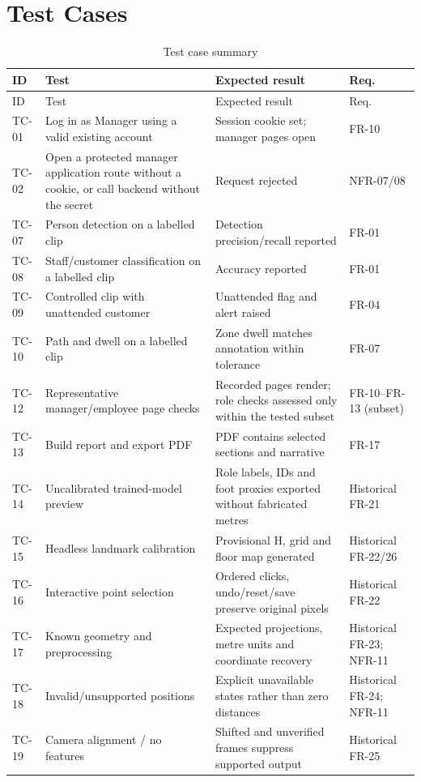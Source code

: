 \section{Test Cases}
\begin{longtable}{P{0.09\textwidth}P{0.3\textwidth}P{0.32\textwidth}P{0.14\textwidth}}
\caption{Test case summary}\\
\toprule
ID & Test & Expected result & Req.\\
\midrule
\endfirsthead
\toprule
ID & Test & Expected result & Req.\\
\midrule
\endhead
TC-01 & Log in as Manager using a valid existing account & Session cookie set; manager pages open & FR-10\\
TC-02 & Open a protected manager application route without a cookie, or call backend without the secret & Request rejected & NFR-07/08\\
TC-07 & Person detection on a labelled clip & Detection precision/recall reported & FR-01\\
TC-08 & Staff/customer classification on a labelled clip & Accuracy reported & FR-01\\
TC-09 & Controlled clip with unattended customer & Unattended flag and alert raised & FR-04\\
TC-10 & Path and dwell on a labelled clip & Zone dwell matches annotation within tolerance & FR-07\\
TC-12 & Representative manager/employee page checks & Recorded pages render; role checks assessed only within the tested subset & FR-10--FR-13 (subset)\\
TC-13 & Build report and export PDF & PDF contains selected sections and narrative & FR-17\\
TC-14 & Uncalibrated trained-model preview & Role labels, IDs and foot proxies exported without fabricated metres & Historical FR-21\\
TC-15 & Headless landmark calibration & Provisional H, grid and floor map generated & Historical FR-22/26\\
TC-16 & Interactive point selection & Ordered clicks, undo/reset/save preserve original pixels & Historical FR-22\\
TC-17 & Known geometry and preprocessing & Expected projections, metre units and coordinate recovery & Historical FR-23; NFR-11\\
TC-18 & Invalid/unsupported positions & Explicit unavailable states rather than zero distances & Historical FR-24; NFR-11\\
TC-19 & Camera alignment / no features & Shifted and unverified frames suppress supported output & Historical FR-25\\

\end{longtable}
